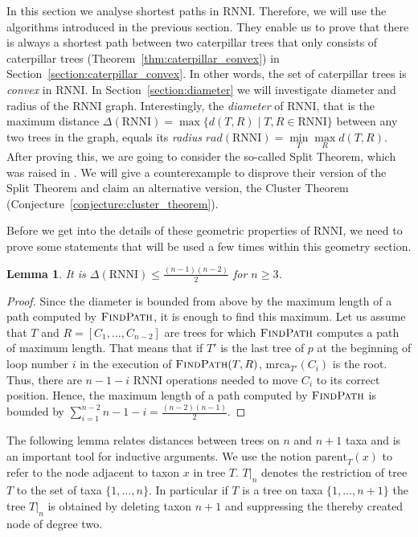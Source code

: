 \documentclass{amsart}
\newcommand{\parent}{\mathrm{parent}}
\newcommand{\mrca}{\mathrm{mrca}}
\newcommand{\rnni}{\mathrm{RNNI}}
\newcommand{\findpath}{\textsc{FindPath}}
\newtheorem{lemma}[definition]{Lemma}
\begin{document}
In this section we analyse shortest paths in $\rnni$.
Therefore, we will use the algorithms introduced in the previous section.
They enable us to prove that there is always a shortest path between two caterpillar trees that only consists of caterpillar trees (Theorem~\ref{thm:caterpillar_convex}) in Section~\ref{section:caterpillar_convex}.
In other words, the set of caterpillar trees is \emph{convex} in $\rnni$.
In Section~\ref{section:diameter} we will investigate diameter and radius of the $\rnni$ graph.
Interestingly, the \emph{diameter} of $\rnni$, that is the maximum distance $\Delta(\rnni) = \max \{d(T, R) \mid T, R \in \rnni\}$ between any two trees in the graph, equals its \emph{radius} $rad(\rnni) = \min\limits_T \max\limits_R d(T,R)$.
After proving this, we are going to consider the so-called Split Theorem, which was raised in \autocite{Gavryushkin2018-ol}.
We will give a counterexample to disprove their version of the Split Theorem and claim an alternative version, the Cluster Theorem (Conjecture~\ref{conjecture:cluster_theorem}).

Before we get into the details of these geometric properties of $\rnni$, we need to prove some statements that will be used a few times within this geometry section.

\begin{lemma}
It is $\Delta(\rnni) \leq \frac{(n-1)(n-2)}{2}$ for $n \geq 3$.
\label{lemma:diameter_bound}
\end{lemma}

\begin{proof}
Since the diameter is bounded from above by the maximum length of a path computed by $\findpath$, it is enough to find this maximum.
Let us assume that $T$ and $R = [C_1, \ldots, C_{n-2}]$ are trees for which $\findpath$ computes a path of maximum length.
That means that if $T'$ is the last tree of $p$ at the beginning of loop number $i$ in the execution of $\findpath(T,R)$, $\mrca_{T'}(C_i)$ is the root.
Thus, there are $n-1-i$ $\rnni$ operations needed to move $C_i$ to its correct position.
Hence, the maximum length of a path computed by $\findpath$ is bounded by $\sum\limits_{i = 1}^{n-2} n-1-i = \frac{(n-2)(n-1)}{2}$.
\end{proof}

The following lemma relates distances between trees on $n$ and $n+1$ taxa and is an important tool for inductive arguments.
We use the notion $\parent_T(x)$ to refer to the node adjacent to taxon $x$ in tree $T$.
$T{\big|}_n$ denotes the restriction of tree $T$ to the set of taxa $\{1, \ldots, n\}$.
In particular if $T$ is a tree on taxa $\{1, \ldots, n+1\}$ the tree $T{\big|}_n$ is obtained by deleting taxon $n+1$ and suppressing the thereby created node of degree two.
\end{document}
